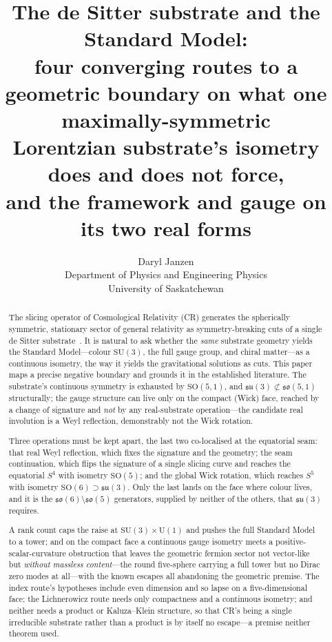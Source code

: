 \documentclass[11pt]{article}
\title{The de Sitter substrate and the Standard Model:\\
\large four converging routes to a geometric boundary on what one maximally-symmetric\\
Lorentzian substrate's isometry does and does not force,\\
and the framework and gauge on its two real forms}
\author{Daryl Janzen\\
\small Department of Physics and Engineering Physics\\
\small University of Saskatchewan}
\date{}
\theoremstyle{plain}
\theoremstyle{remark}
\newcommand{\so}{\mathfrak{so}}
\newcommand{\su}{\mathfrak{su}}
\newcommand{\SO}{\mathrm{SO}}
\newcommand{\SU}{\mathrm{SU}}
\begin{document}
\maketitle

\begin{abstract}
The slicing operator of Cosmological Relativity (CR) generates the spherically symmetric, stationary sector of general relativity as symmetry-breaking cuts of a single de Sitter substrate~\cite{JanzenOperator,JanzenRange}. It is natural to ask whether the \emph{same} substrate geometry yields the Standard Model---colour $\SU(3)$, the full gauge group, and chiral matter---as a continuous isometry, the way it yields the gravitational solutions as cuts. This paper maps a precise negative boundary and grounds it in the established literature. The substrate's continuous symmetry is exhausted by $\SO(5,1)$, and $\su(3)\not\subset\so(5,1)$ structurally; the gauge structure can live only on the compact (Wick) face, reached by a change of signature and \emph{not} by any real-substrate operation---the candidate real involution is a Weyl reflection, demonstrably not the Wick rotation. 

Three operations must be kept apart, the last two co-localised at the equatorial seam: that real Weyl reflection, which fixes the signature and the geometry; the seam continuation, which flips the signature of a single slicing curve and reaches the equatorial $S^4$ with isometry $\SO(5)$; and the global Wick rotation, which reaches $S^5$ with isometry $\SO(6)\supset\su(3)$. Only the last lands on the face where colour lives, and it is the $\so(6)\setminus\so(5)$ generators, supplied by neither of the others, that $\su(3)$ requires. 

A rank count caps the raise at $\SU(3)\times\mathrm{U}(1)$ and pushes the full Standard Model to a tower; and on the compact face a continuous gauge isometry meets a positive-scalar-curvature obstruction that leaves the geometric fermion sector not vector-like but \emph{without massless content}---the round five-sphere carrying a full tower but no Dirac zero modes at all---with the known escapes all abandoning the geometric premise. The index route's hypotheses include even dimension and so lapse on a five-dimensional face; the Lichnerowicz route needs only compactness and a continuous isometry; and neither needs a product or Kaluza--Klein structure, so that CR's being a single irreducible substrate rather than a product is by itself no escape---a premise neither theorem used. 


\end{abstract}
\end{document}
